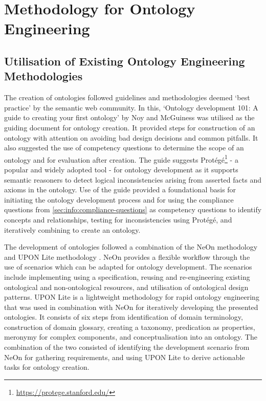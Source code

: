 \section{Methodology for Ontology Engineering}\label{sec:voc:methodology}

\subsection{Utilisation of Existing Ontology Engineering Methodologies}
The creation of ontologies followed guidelines and methodologies deemed `best practice' by the semantic web community. In this, `Ontology development 101: A guide to creating your first ontology' by Noy and McGuiness \cite{noy_ontology_2001} was utilised as the guiding document for ontology creation. It provided steps for construction of an ontology with attention on avoiding bad design decisions and common pitfalls. It also suggested the use of competency questions to determine the scope of an ontology and for evaluation after creation.
The guide suggests Protégé\footnote{\url{https://protege.stanford.edu/}} - a popular and widely adopted tool - for ontology development as it supports semantic reasoners to detect logical inconsistencies arising from asserted facts and axioms in the ontology.
Use of the guide provided a foundational basis for initiating the ontology development process and for using the compliance questions from \autoref{sec:info:compliance-questions} as competency questions to identify concepts and relationships, testing for inconsistencies using Protégé, and iteratively combining to create an ontology. 

The development of ontologies followed a combination of the NeOn methodology \cite{suarez-figueroa_neon_2012} and UPON Lite methodology \cite{de_nicola_lightweight_2016}. NeOn provides a flexible workflow through the use of scenarios which can be adapted for ontology development. The scenarios include implementing using a specification, reusing and re-engineering existing ontological and non-ontological resources, and utilisation of ontological design patterns. 
UPON Lite is a lightweight methodology for rapid ontology engineering that was used in combination with NeOn for iteratively developing the presented ontologies. It consists of six steps from identification of domain terminology, construction of domain glossary, creating a taxonomy, predication as properties, meronymy for complex components, and conceptualisation into an ontology.
The combination of the two consisted of identifying the development scenario from NeOn for gathering requirements, and using UPON Lite to derive actionable tasks for ontology creation.

